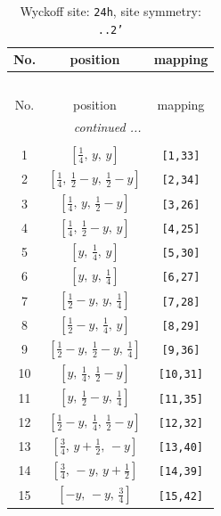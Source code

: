 \documentclass[fleqn,8pt]{jsarticle}
\begin{document}
\begin{longtable}{ccc}
\caption{Wyckoff site: {\tt 24h}, site symmetry: {\tt ..2'}}
 \\
 \hline \hline
No. & position & mapping \\ \hline \endfirsthead

\multicolumn{2}{l}{\tablename\ \thetable{}} \\
 \hline \hline
No. & position & mapping \\ \hline \endhead

 \hline \hline
\multicolumn{2}{r}{\footnotesize\it continued ...} \\ \endfoot

 \hline \hline
\multicolumn{2}{r}{} \\ \endlastfoot

1 & $\left[ \frac{1}{4},\, y,\, y \right]$ & {\tt [1,33]} \\ \hline
2 & $\left[ \frac{1}{4},\, \frac{1}{2} - y,\, \frac{1}{2} - y \right]$ & {\tt [2,34]} \\ \hline
3 & $\left[ \frac{1}{4},\, y,\, \frac{1}{2} - y \right]$ & {\tt [3,26]} \\ \hline
4 & $\left[ \frac{1}{4},\, \frac{1}{2} - y,\, y \right]$ & {\tt [4,25]} \\ \hline
5 & $\left[ y,\, \frac{1}{4},\, y \right]$ & {\tt [5,30]} \\ \hline
6 & $\left[ y,\, y,\, \frac{1}{4} \right]$ & {\tt [6,27]} \\ \hline
7 & $\left[ \frac{1}{2} - y,\, y,\, \frac{1}{4} \right]$ & {\tt [7,28]} \\ \hline
8 & $\left[ \frac{1}{2} - y,\, \frac{1}{4},\, y \right]$ & {\tt [8,29]} \\ \hline
9 & $\left[ \frac{1}{2} - y,\, \frac{1}{2} - y,\, \frac{1}{4} \right]$ & {\tt [9,36]} \\ \hline
10 & $\left[ y,\, \frac{1}{4},\, \frac{1}{2} - y \right]$ & {\tt [10,31]} \\ \hline
11 & $\left[ y,\, \frac{1}{2} - y,\, \frac{1}{4} \right]$ & {\tt [11,35]} \\ \hline
12 & $\left[ \frac{1}{2} - y,\, \frac{1}{4},\, \frac{1}{2} - y \right]$ & {\tt [12,32]} \\ \hline
13 & $\left[ \frac{3}{4},\, y + \frac{1}{2},\, - y \right]$ & {\tt [13,40]} \\ \hline
14 & $\left[ \frac{3}{4},\, - y,\, y + \frac{1}{2} \right]$ & {\tt [14,39]} \\ \hline
15 & $\left[ - y,\, - y,\, \frac{3}{4} \right]$ & {\tt [15,42]} \\ \hline

\end{longtable}
\end{document}
